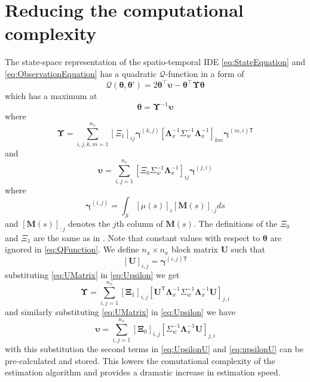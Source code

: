 \documentclass[journal,a4paper]{IEEEtran}
\begin{document}
{{\section*{Reducing the computational complexity}\label{App:ReducedRTS}
The state-space representation of the spatio-temporal IDE \eqref{eq:StateEquation} and \eqref{eq:ObservationEquation} has a quadratic $\mathcal Q$-function in a form of \cite{Dewar2009}
\begin{equation}
\mathcal{Q}\left(\boldsymbol\theta,\boldsymbol\theta'\right)=2 \boldsymbol\theta^\top\boldsymbol\upsilon -\boldsymbol\theta^\top\boldsymbol\Upsilon\boldsymbol\theta
\label{eq:QFunction}
\end{equation}
which has a maximum at
\begin{equation}
 \boldsymbol\theta=\boldsymbol\Upsilon^{-1}\boldsymbol\upsilon
\end{equation}
where
\begin{equation}\label{eq:Upsilon}
 \boldsymbol\Upsilon=\sum_{i,j,k,m=1}^{n_x}\left[ \Xi_1\right] _{ij}\boldsymbol\gamma^{\left(k,j\right)}\left[\boldsymbol\Lambda_{x}^{-1}\Sigma_{w}^{-1} \boldsymbol\Lambda_{x}^{-1}\right]_{km} \boldsymbol\gamma^{\left(m,i\right)\mathsf{T}}
\end{equation}
and
\begin{equation}
 \boldsymbol \upsilon=\sum_{i,j=1}^{n_x}\left[\Xi_0\Sigma_{w}^{-1}\boldsymbol\Lambda_{x}^{-1} \right]_{ij}\boldsymbol\gamma^{\left(j,i\right)} 
\end{equation}
where
\begin{equation}
 \boldsymbol\gamma^{(i,j)}=\int_{\mathcal S}\left[ \mu(s)\right]_i\left[ \mathbf M(s)\right] _{:j}ds
\end{equation}
and $\left[ \mathbf M(s)\right] _{:j}$ denotes the $j$th column of $\mathbf M(s)$. The definitions of the $\Xi_0$ and $\Xi_1$ are the same as in \cite{Dewar2009}. Note that constant values with respect to $\boldsymbol \theta$ are ignored in \eqref{eq:QFunction}.
We define $n_x \times n_x$ block matrix $\mathbf U$ such that
\begin{equation}\label{eq:UMatrix}
 [\mathbf U]_{i,j}=\boldsymbol\gamma^{(i,j)\mathsf{T}}
\end{equation}
substituting \eqref{eq:UMatrix} in \eqref{eq:Upsilon} we get
\begin{equation}\label{eq:UpsilonU}
 \boldsymbol\Upsilon=\sum_{i,j=1}^{n_x}[\boldsymbol\Xi_1]_{i,j}[\mathbf{U}^{\mathsf T} \boldsymbol\Lambda_{x}^{-1}\Sigma_{w}^{-1}\boldsymbol\Lambda_{x}^{-1}\mathbf{U}]_{j,i}
\end{equation}
and similarly substituting \eqref{eq:UMatrix} in \eqref{eq:Upsilon} we have
\begin{equation}\label{eq:upsilonU}
 \boldsymbol\upsilon=\sum_{i,j=1}^{n_x}[\boldsymbol\Xi_0]_{i,j}[\Sigma_{w}^{-1}\boldsymbol\Lambda_{x}^{-1}\mathbf U]_{j,i}
\end{equation}
with this substitution the second terms in \eqref{eq:UpsilonU} and \eqref{eq:upsilonU} can be pre-calculated and stored. This lowers the comutational complexity of the estimation algorithm and provides a dramatic increase in estimation speed.
}}
\end{document}
